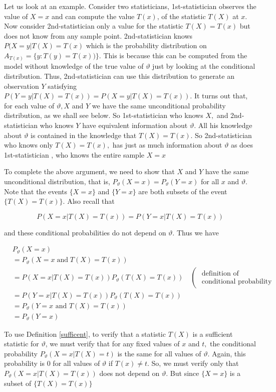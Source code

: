 \documentclass[ 11pt,%
				a4paper,%
				twoside,%
				headinclude,%
				footinclude = true,%
				cleardoublepage = empty,%
				reqno]{scrbook}
\begin{document}
Let us look at an example. Consider two statisticians,    1st-statistician observes the value of $X = x$ and can compute the value  $T(x)$, of the statistic $T(X)$ at $x$. Now consider 2nd-statistician only a value for the statistic $T(X)= T(x)$ but does not know from any sample point. 2nd-statistician knows $P(X= y | T(X)=T(x)$ which is the probability distribution on $A_{T(x)}=\{y: T(y)=T(x))\}$. This is because this can be computed from the model without knowledge of the true value of $\vartheta$ just by looking at the conditional distribution. Thus, 2nd-statistician can use this distribution to generate an observation $Y$ satisfying $P(Y=y | T(X)= T(x))=P(X=y | T(X)=T(x))$. It turns out that, for each value of $\vartheta, X$ and $Y$ we have the same unconditional probability distribution, as we shall see below. So 1st-statistician who knows $X,$ and 2nd-statistician who knows $Y$ have equivalent information about $\vartheta$. All his knowledge about $\vartheta$ is contained in the knowledge that $T(X)=T(x) .$ So 2nd-statistician  who knows only $T(X)=T(x),$ has just as much information about $\vartheta$ as does 1st-statistician , who knows the entire sample $X=x$

To complete the above argument, we need to show that $X$ and $Y$ have the same unconditional distribution, that is, $P_{\vartheta}(X=x)=P_{\vartheta}(Y=x)$ for all $x$ and $\vartheta .$ Note that the events $\{X=x\}$ and $\{Y=x\}$ are both subsets of the event $\{T(X)=T(x)\}$. Also recall that

\[
P(X=x | T(X)=T(x))=P(Y=x | T(X)=T(x))
\]

and these conditional probabilities do not depend on $\vartheta .$ Thus we have

\begin{align*}
&P_{\vartheta}(X=x) \\
&=P_{\vartheta}(X=x \operatorname{and} T(X)=T(x)) \\
&=P(X=x | T(X)=T(x)) P_{\vartheta}(T(X)=T(x)) \quad\left(\begin{array}{c}
\text { definition of } \\
\text { conditional probability }
\end{array}\right.\\
&=P(Y=x | T(X)=T(x)) P_{\vartheta}(T(X)=T(x)) \\
&=P_{\vartheta}(Y=x \text { and } T(X)=T(x)) \\
&=P_{\vartheta}(Y=x)
\end{align*}

To use Definition \ref{sufficent}, to verify that a statistic $T(X)$ is a sufficient statistic for $\vartheta$, we must verify that for any fixed values of $x$ and $t,$ the conditional probability $P_{\vartheta}(X=x | T(X)=t)$ is the same for all values of $\vartheta$. Again, this probability is 0 for all values of $\vartheta$ if $T(x) \neq t$. So, we must verify only that $P_{\vartheta}(X=x | T(X)=T(x))$ does not depend on $\vartheta$. But since $\{X=x\}$ is a subset of $\{T(X)=T(x)\}$
\end{document}
